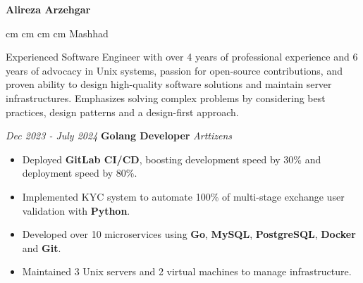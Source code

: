\documentclass{engineercv}
\begin{document}
\begin{center}
  \textbf{\fontsize{24 pt}{24 pt}\selectfont Alireza Arzehgar}

  \vspace{0.2 cm}

  \scriptsize
  \mbox{}
   cm
  \mbox{}
   cm
  \mbox{}
   cm
  \mbox{}
   cm
  \mbox{{\color{black}\footnotesize\faMapMarker*}\hspace*{0.13cm}Mashhad}
\end{center}

Experienced Software Engineer with over 4 years of professional experience and 6 years of advocacy in Unix systems,
passion for open-source contributions, and proven ability to design high-quality software solutions and
maintain server infrastructures. Emphasizes solving complex problems by considering best practices,
design patterns and a design-first approach.


\begin{twocolentry}{\textit{Dec 2023 - July 2024}}
  \textbf{Golang Developer}
  \textit{Arttizens}
\end{twocolentry}

\begin{itemize}
  \item Deployed \textbf{GitLab CI/CD}, boosting development speed by 30\% and deployment speed by 80\%.
  \item Implemented KYC system to automate 100\% of multi-stage exchange user validation with \textbf{Python}.
  \item Developed over 10 microservices using \textbf{Go}, \textbf{MySQL}, \textbf{PostgreSQL}, \textbf{Docker} and \textbf{Git}.
  \item Maintained 3 Unix servers and 2 virtual machines to manage infrastructure.
\end{itemize}
\end{document}
